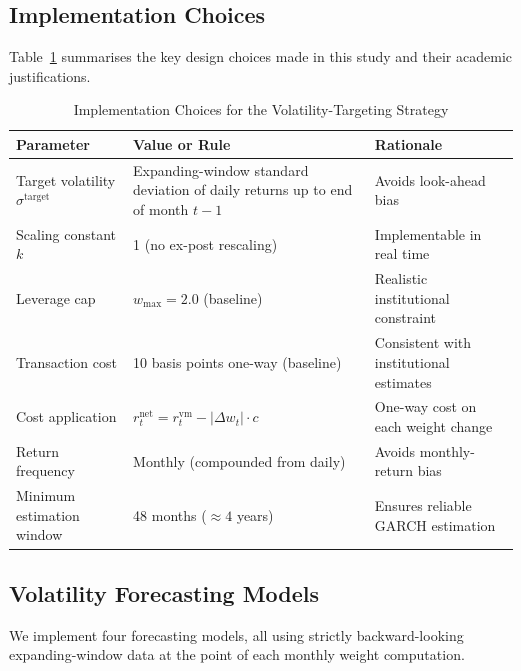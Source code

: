 \documentclass[12pt, a4paper]{article}
\newcommand{\stgt}{\sigma^{\mathrm{target}}}
\begin{document}
\subsection{Implementation Choices}
\label{sec:implementation}

Table~\ref{tab:implementation} summarises the key design choices made in this study and
their academic justifications.

\begin{table}[H]
  \centering
  \caption{Implementation Choices for the Volatility-Targeting Strategy}
  \label{tab:implementation}
  \small
  \begin{tabularx}{\textwidth}{lXX}
    \toprule
    \textbf{Parameter} & \textbf{Value or Rule} & \textbf{Rationale} \\
    \midrule
    Target volatility $\stgt$ & Expanding-window standard deviation of daily returns up
                                to end of month $t-1$
      & Avoids look-ahead bias \citep{Bongaerts2020} \\
    Scaling constant $k$ & 1 (no ex-post rescaling) & Implementable in real time \\
    Leverage cap & $w_{\max} = 2.0$ (baseline) & Realistic institutional constraint \\
    Transaction cost & 10 basis points one-way (baseline) & Consistent with institutional
                                                            estimates \citep{Frazzini2018} \\
    Cost application & $r_t^{\mathrm{net}} = r_t^{\mathrm{vm}} - |\Delta w_t| \cdot c$
      & One-way cost on each weight change \\
    Return frequency & Monthly (compounded from daily) & Avoids monthly-return bias \\
    Minimum estimation window & 48 months ($\approx 4$ years) & Ensures reliable GARCH
                                                                estimation \\
    \bottomrule
  \end{tabularx}
\end{table}

\subsection{Volatility Forecasting Models}

We implement four forecasting models, all using strictly backward-looking expanding-window
data at the point of each monthly weight computation.
\end{document}
